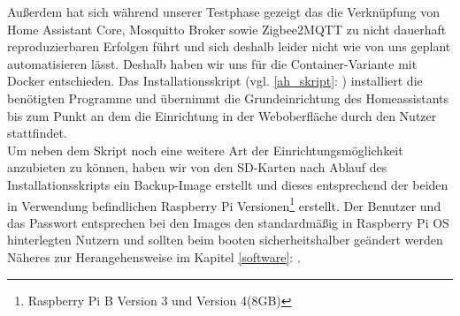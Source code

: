 Außerdem hat sich während unserer Testphase gezeigt das die Verknüpfung von Home Assistant Core, Mosquitto Broker sowie Zigbee2MQTT zu nicht dauerhaft reproduzierbaren Erfolgen führt und sich deshalb leider nicht wie von uns geplant automatisieren lässt. 
Deshalb haben wir uns für die Container-Variante mit Docker entschieden. 
Das Installationsskript (vgl. \ref{ah_skript}: ) installiert die benötigten Programme und übernimmt die Grundeinrichtung des Homeassistants bis zum Punkt an dem die Einrichtung in der Weboberfläche durch den Nutzer stattfindet.\\
\noindent Um neben dem Skript noch eine weitere Art der Einrichtungsmöglichkeit anzubieten zu können, haben wir von den SD-Karten nach Ablauf des Installationsskripts ein Backup-Image erstellt und dieses entsprechend der beiden in Verwendung befindlichen Raspberry Pi Versionen\footnote{Raspberry Pi B Version 3 und Version 4(8GB)} erstellt.
Der Benutzer und das Passwort entsprechen bei den Images den standardmäßig in Raspberry Pi OS hinterlegten Nutzern und sollten beim booten sicherheitshalber geändert werden\\
\noindent Näheres zur Herangehensweise im Kapitel \ref{software}: .